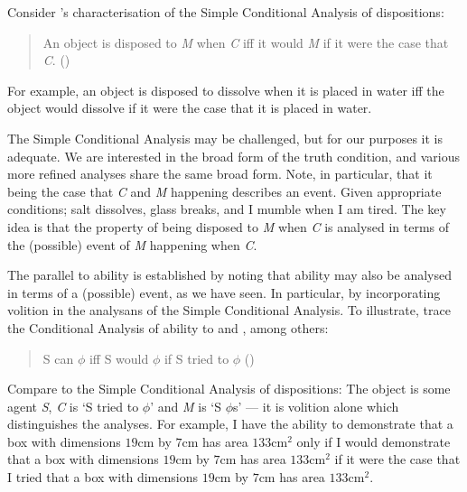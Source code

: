 \begin{note}
  Consider \cite{Choi:2021wg}'s characterisation of the Simple Conditional Analysis of dispositions:
  \begin{quote}
    An object is disposed to \emph{M} when \emph{C} iff it would \emph{M} if it were the case that \emph{C}.\nolinebreak
    \mbox{}\hfill\mbox{(\citeyear{Choi:2021wg})}
  \end{quote}
  For example, an object is disposed to dissolve when it is placed in water iff the object would dissolve if it were the case that it is placed in water.

  The Simple Conditional Analysis may be challenged, but for our purposes it is adequate.
  We are interested in the broad form of the truth condition, and various more refined analyses share the same broad form.
  Note, in particular, that it being the case that \emph{C} and \emph{M} happening describes an event.
  Given appropriate conditions; salt dissolves, glass breaks, and I mumble when I am tired.
  The key idea is that the property of being disposed to \emph{M} when \emph{C} is analysed in terms of the (possible) event of \emph{M} happening when \emph{C}.

  The parallel to ability is established by noting that ability may also be analysed in terms of a (possible) event, as we have seen.
  In particular, by incorporating volition in the analysans of the Simple Conditional Analysis.
  To illustrate, \citeauthor{Mandelkern:2017aa} trace the Conditional Analysis of ability  to \textcite{Hume:1748tp} and \textcite{Moore:1912te}, among others:
  \begin{quote}
    S can \(\phi\) iff S would \(\phi\) if S tried to \(\phi\)\nolinebreak
    \mbox{}\hfill\mbox{(\citeyear[Cf.][308]{Mandelkern:2017aa})}
  \end{quote}
  Compare to the Simple Conditional Analysis of dispositions:
  The object is some agent \emph{S}, \emph{C} is `S tried to \(\phi\)' and \emph{M} is `S \(\phi\)s' --- it is volition alone which distinguishes the analyses.
  For example, I have the ability to demonstrate that a box with dimensions \(19\text{cm}\) by \(7\text{cm}\) has area \(133\text{cm}^{2}\) only if I would demonstrate that a box with dimensions \(19\text{cm}\) by \(7\text{cm}\) has area \(133\text{cm}^{2}\) if it were the case that I tried that a box with dimensions \(19\text{cm}\) by \(7\text{cm}\) has area \(133\text{cm}^{2}\).
\end{note}

